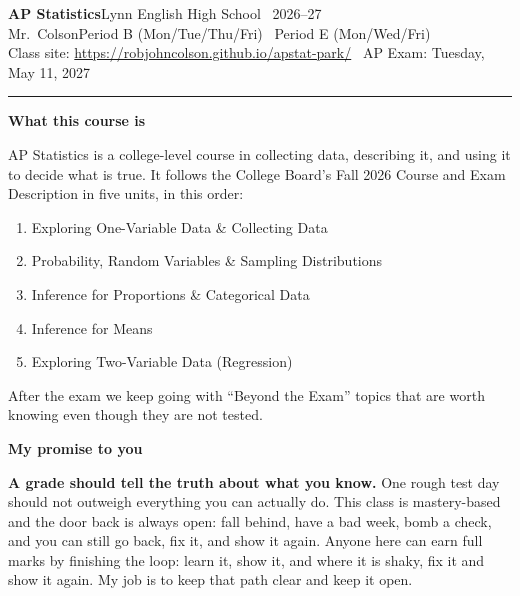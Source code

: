 \documentclass[10pt]{article}
\newcommand{\banner}[1]{%
  \vspace{4pt}\begin{tcolorbox}[enhanced, boxrule=0pt, arc=1pt, colback=dayblue, left=6pt, right=6pt, top=3pt, bottom=3pt]
  {\color{white}\bfseries\large #1}\end{tcolorbox}\vspace{-2pt}}
\begin{document}
{\LARGE\bfseries AP Statistics}\hfill{\large Lynn English High School \textperiodcentered\ 2026--27}\\
{\large Mr.~Colson}\hfill{\small Period B (Mon/Tue/Thu/Fri) \textperiodcentered\ Period E (Mon/Wed/Fri)}\\
{\small Class site: \url{https://robjohncolson.github.io/apstat-park/} \textperiodcentered\ AP Exam: Tuesday, May 11, 2027}
\vspace{2pt}\hrule

\banner{What this course is}
AP Statistics is a college-level course in collecting data, describing it, and using it to decide what is true.
It follows the College Board's Fall 2026 Course and Exam Description in five units, in this order:

\begin{enumerate}[leftmargin=1.6em, itemsep=1pt, topsep=2pt]
  \item Exploring One-Variable Data \& Collecting Data
  \item Probability, Random Variables \& Sampling Distributions
  \item Inference for Proportions \& Categorical Data
  \item Inference for Means
  \item Exploring Two-Variable Data (Regression)
\end{enumerate}
After the exam we keep going with ``Beyond the Exam'' topics that are worth knowing even though they are not tested.

\banner{My promise to you}
\begin{tcolorbox}[enhanced, colback=callout, colframe=dayblue, boxrule=0.6pt, arc=2pt, left=7pt, right=7pt, top=4pt, bottom=4pt]
\textbf{A grade should tell the truth about what you know.} One rough test day should not outweigh everything you can
actually do. This class is mastery-based and the door back is always open: fall behind, have a bad week, bomb a check,
and you can still go back, fix it, and show it again. Anyone here can earn full marks by finishing the loop: learn it, show
it, and where it is shaky, fix it and show it again. My job is to keep that path clear and keep it open.
\end{tcolorbox}
\end{document}
